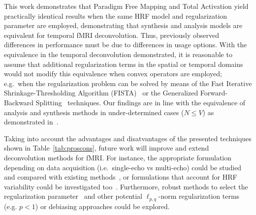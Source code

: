 This work demonstrates that Paradigm Free Mapping and Total Activation yield practically identical results when the same HRF model and regularization parameter are employed, demonstrating that synthesis and analysis models are equivalent for temporal fMRI deconvolution. Thus, previously observed differences in performance must be due to differences in usage options. With the equivalence in the temporal deconvolution demonstrated, it is reasonable to assume that additional regularization terms in the spatial or temporal domains would not modify this equivalence when convex operators are employed; e.g.\ when the regularization problem can be solved by means of the Fast Iterative Shrinkage-Thresholding Algorithm (FISTA)~\cite{beck2009FastIterativeShrinkagethresholding} or the Generalized Forward-Backward Splitting~\cite{raguet2013GeneralizedForwardBackwardSplittinga} techniques. Our findings are in line with the equivalence of analysis and synthesis methods in under-determined cases (\(N \leq V\)) as demonstrated in~\cite{elad2007AnalysisSynthesisSignal}.

Taking into account the advantages and disatvantages of the presented techniques shown in Table~\ref{tab:proscons}, future work will improve and extend deconvolution methods for fMRI. For instance, the appropriate formulation depending on data acquisition (i.e.\ single-echo vs multi-echo) could be studied and compared with existing methods~\cite{caballero-gaudes2019DeconvolutionAlgorithmMultiecho}, or formulations that account for HRF variability could be investigated too~\cite{badillo2013GrouplevelImpactsBetweensubject,gaudes2012StructuredSparseDeconvolution,farouj2019BoldSignalDeconvolution}. Furthermore, robust methods to select the regularization parameter~\cite{urunuela2020StabilityBasedSparseParadigm,meinshausen2009StabilitySelection} and other potential \(\ell_{p,q}\)-norm regularization terms (e.g. \(p < 1\)) or debiasing approaches could be explored.